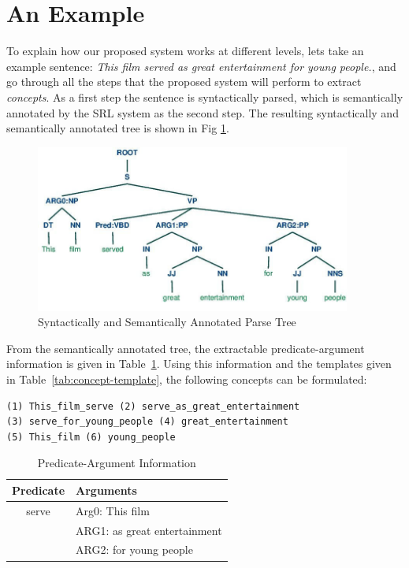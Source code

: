 \documentclass[runningheads,a4paper]{llncs}
\begin{document}
\section{An Example} 
To explain how our proposed system works at different levels, lets take an example sentence: \textit{This film served as great entertainment for young people.}, and go through all the steps that the proposed system will perform to extract \textit{concepts}. As a first step the sentence is syntactically parsed, which is semantically annotated by the SRL system as the second step. The resulting syntactically and semantically annotated tree is shown in Fig \ref{fig:parse-tree}.
\begin{figure}[!h]
\centering
\includegraphics[width=.8\textwidth,height=5.5cm]{parse-tree6.jpg}
\caption{Syntactically and Semantically Annotated Parse Tree}
\label{fig:parse-tree}
\end{figure} 
From the semantically annotated tree, the extractable predicate-argument information is given in Table~\ref{tab:pred-arg-info}. Using this information and the templates given in Table~\ref{tab:concept-template}, the following concepts can be formulated:
\begin{verbatim}
(1) This_film_serve (2) serve_as_great_entertainment
(3) serve_for_young_people (4) great_entertainment
(5) This_film (6) young_people
\end{verbatim}
\begin{table}[!h]
\centering
\begin{tabular}{cp{10cm}}
\hline Predicate &  Arguments\\ 
\hline serve  & Arg0: This film \\
 & ARG1: as great entertainment \\
 & ARG2: for young people \\
\hline 
\end{tabular} 
\caption{Predicate-Argument Information}
\label{tab:pred-arg-info}
\end{table}    
\end{document}
